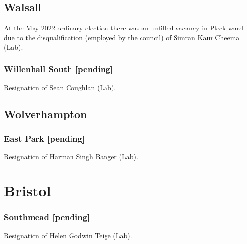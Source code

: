 \documentclass[a4paper,openany]{book}
\begin{document}
\begin{resultsiii}
\subsection*{Walsall}

At the May 2022 ordinary election there was an unfilled vacancy in Pleck ward due to the disqualification (employed by the council) of Simran Kaur Cheema (Lab).%

\subsubsection*{Willenhall South \hspace*{\fill}\nolinebreak[1]%
	\enspace\hspace*{\fill}
	[pending]}


Resignation of Sean Coughlan (Lab).

\subsection*{Wolverhampton}

\subsubsection*{East Park \hspace*{\fill}\nolinebreak[1]%
	\enspace\hspace*{\fill}
	[pending]}


Resignation of Harman Singh Banger (Lab).

\section{Bristol}

\subsubsection*{Southmead \hspace*{\fill}\nolinebreak[1]%
	\enspace\hspace*{\fill}
	[pending]}


Resignation of Helen Godwin Teige (Lab).


\end{resultsiii}
\end{document}
